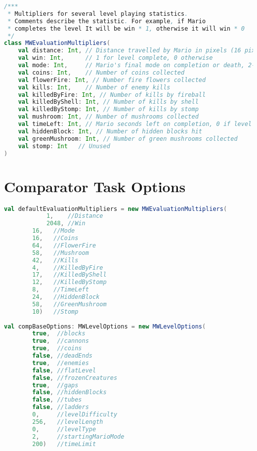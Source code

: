 \begin{appendices}
\begin{minipage}{0.9\linewidth}
\begin{lstlisting}[language=scala, basicstyle=\scriptsize\ttfamily, caption={Full field definitions for MW\-Level\-Options and MW\-Evaluation\-Multipliers described in Section \ref{subsec:paramclasses}}]
/***
 * Multipliers for several level playing statistics.
 * Comments describe the statistic. For example, if Mario
 * completes the level It will be win * 1, otherwise it will win * 0
 */
class MWEvaluationMultipliers(
    val distance: Int, // Distance travelled by Mario in pixels (16 pixels to a block)
    val win: Int,      // 1 for level complete, 0 otherwise
    val mode: Int,     // Mario's final mode on completion or death, 2-fire, 1-big, 0-small
    val coins: Int,    // Number of coins collected
    val flowerFire: Int, // Number fire flowers collected
    val kills: Int,    // Number of enemy kills
    val killedByFire: Int, // Number of kills by fireball
    val killedByShell: Int, // Number of kills by shell
    val killedByStomp: Int, // Number of kills by stomp
    val mushroom: Int, // Number of mushrooms collected
    val timeLeft: Int, // Mario seconds left on completion, 0 if level not completed
    val hiddenBlock: Int, // Number of hidden blocks hit
    val greenMushroom: Int, // Number of green mushrooms collected
    val stomp: Int   // Unused
)
\end{lstlisting}
\end{minipage}

\section{Comparator Task Options}
\label{app:comptask}
\setcounter{lstlisting}{0}


\begin{minipage}{0.9\linewidth}
\begin{lstlisting}[language=scala, basicstyle=\scriptsize\ttfamily, caption=Parameter classes for the comparator task described in Section \ref{subsec:comptask}]
val defaultEvaluationMultipliers = new MWEvaluationMultipliers(
        	1,    //Distance
        	2048, //Win
		16,   //Mode
		16,   //Coins
		64,   //FlowerFire
		58,   //Mushroom
		42,   //Kills
		4,    //KilledByFire
		17,   //KilledByShell
		12,   //KilledByStomp
		8,    //TimeLeft
		24,   //HiddenBlock
		58,   //GreenMushroom
		10)   //Stomp
		
val compBaseOptions: MWLevelOptions = new MWLevelOptions(
		true,  //blocks
		true,  //cannons
		true,  //coins
		false, //deadEnds
		true,  //enemies
		false, //flatLevel
		false, //frozenCreatures
		true,  //gaps
		false, //hiddenBlocks
		false, //tubes
		false, //ladders
		0,     //levelDifficulty
		256,   //levelLength
		0,     //levelType
		2,     //startingMarioMode
		200)   //timeLimit


\end{lstlisting}
\end{minipage}
\end{appendices}
